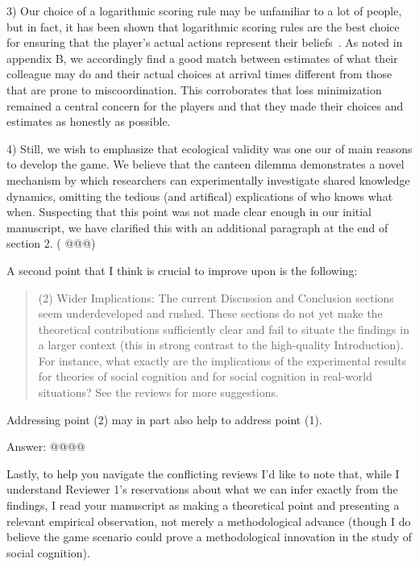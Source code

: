 \documentclass{article}
\newenvironment{robin}{\smallskip \noindent \color{red!10!green!50!blue}}{\color{black}\smallskip}
\begin{document}
\begin{robin}
3) Our choice of a logarithmic scoring rule may be unfamiliar to a lot of people, but in fact, it has been shown that logarithmic scoring rules are the best choice for ensuring that the player's actual actions represent their beliefs~\cite{seidenfeld1985calibration, palfrey2009eliciting}. As noted in appendix B, 
we accordingly find a good match between estimates of what their colleague may do and their actual choices at arrival times different from those that are prone to miscoordination. This corroborates that loss minimization remained a central concern for the players and that they made their choices and estimates as honestly as possible.

4) Still, we wish to emphasize that ecological validity was one our of main reasons to develop the game. We believe that the canteen dilemma demonstrates a novel mechanism by which researchers can experimentally investigate shared knowledge dynamics, omitting the tedious (and artifical) explications of who knows what when. Suspecting that this point was not made clear enough in our initial manuscript, we have clarified this with an additional paragraph at the end of section 2. ( @@@)
\end{robin} 

A second point that I think is crucial to improve upon is the following:
\begin{quote}
(2)    Wider Implications: The current Discussion and Conclusion sections seem underdeveloped and rushed. These sections do not yet make the theoretical contributions sufficiently clear and fail to situate the findings in a larger context (this in strong contrast to the high-quality Introduction). For instance, what exactly are the implications of the experimental results for theories of social cognition and for social cognition in real-world situations? See the reviews for more suggestions.
\end{quote}
Addressing point (2) may in part also help to address point (1). 


\begin{robin}Answer: @@@@
\end{robin}



Lastly, to help you navigate the conflicting reviews I’d like to note that, while I understand Reviewer 1’s reservations about what we can infer exactly from the findings, I read your manuscript as making a theoretical point and presenting a relevant empirical observation, not merely a methodological advance (though I do believe the game scenario could prove a methodological innovation in the study of social cognition). 
\end{document}
